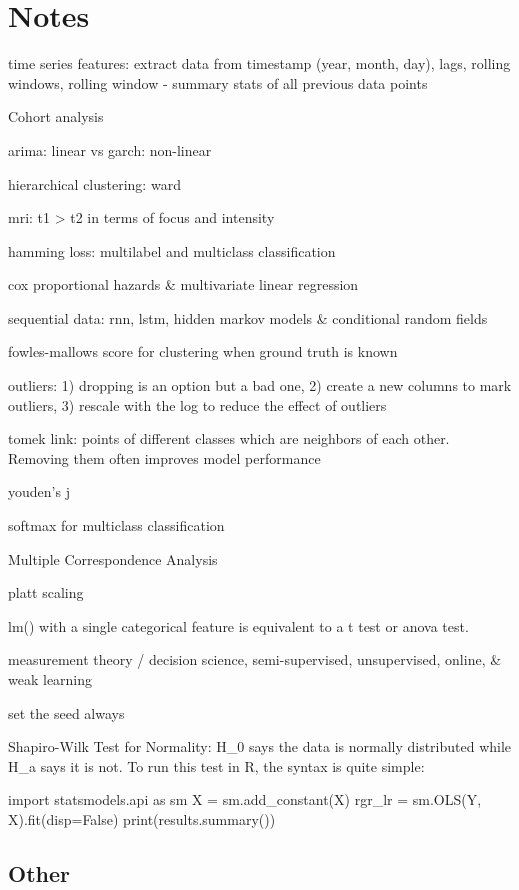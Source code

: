 \documentclass[]{book}
\begin{document}
\chapter{Notes}\label{notes-1}

time series features: extract data from timestamp (year, month, day),
lags, rolling windows, rolling window - summary stats of all previous
data points

Cohort analysis

arima: linear vs garch: non-linear

hierarchical clustering: ward

mri: t1 \textgreater{} t2 in terms of focus and intensity

hamming loss: multilabel and multiclass classification

cox proportional hazards \& multivariate linear regression

sequential data: rnn, lstm, hidden markov models \& conditional random
fields

fowles-mallows score for clustering when ground truth is known

outliers: 1) dropping is an option but a bad one, 2) create a new
columns to mark outliers, 3) rescale with the log to reduce the effect
of outliers

tomek link: points of different classes which are neighbors of each
other. Removing them often improves model performance

youden's j

softmax for multiclass classification

Multiple Correspondence Analysis

platt scaling

lm() with a single categorical feature is equivalent to a t test or
anova test.

measurement theory / decision science, semi-supervised, unsupervised,
online, \& weak learning

set the seed always

Shapiro-Wilk Test for Normality: H\_0 says the data is normally
distributed while H\_a says it is not. To run this test in R, the syntax
is quite simple:

import statsmodels.api as sm X = sm.add\_constant(X) rgr\_lr = sm.OLS(Y,
X).fit(disp=False) print(results.summary())

\section{Other}\label{other-3}
\end{document}
